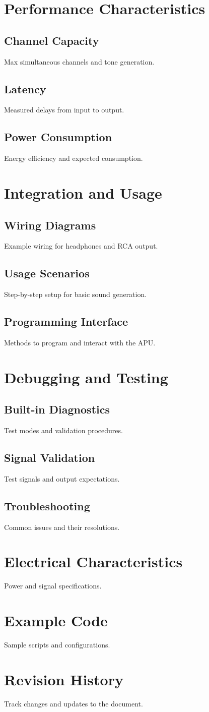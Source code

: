 \documentclass[a4paper,12pt]{article}
\begin{document}
\section{Performance Characteristics}
\subsection{Channel Capacity}
Max simultaneous channels and tone generation.
\subsection{Latency}
Measured delays from input to output.
\subsection{Power Consumption}
Energy efficiency and expected consumption.

\section{Integration and Usage}
\subsection{Wiring Diagrams}
Example wiring for headphones and RCA output.
\subsection{Usage Scenarios}
Step-by-step setup for basic sound generation.
\subsection{Programming Interface}
Methods to program and interact with the APU.

\section{Debugging and Testing}
\subsection{Built-in Diagnostics}
Test modes and validation procedures.
\subsection{Signal Validation}
Test signals and output expectations.
\subsection{Troubleshooting}
Common issues and their resolutions.

\appendix
\section{Electrical Characteristics}
Power and signal specifications.
\section{Example Code}
Sample scripts and configurations.
\section{Revision History}
Track changes and updates to the document.
\end{document}
